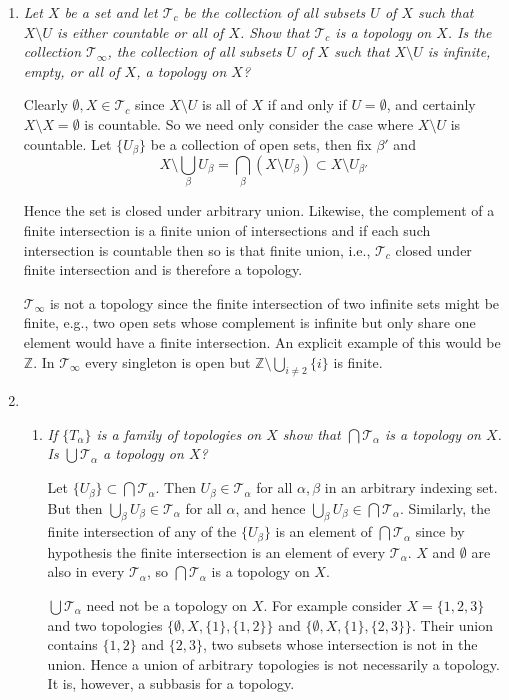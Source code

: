 \documentclass[letterpaper, 11pt]{article}
\newcommand{\Z}{\mathbb{Z}}
\newcommand{\T}{\mathcal{T}}
\begin{document}
\begin{enumerate}
\item \emph{Let $X$ be a set and let $\T_c$ be the collection of all subsets $U$ of $X$ such that $X \setminus U$ is either countable or all of $X$.  Show that $\T_c$ is a topology on $X$.  Is the collection $\T_\infty$, the collection of all subsets $U$ of $X$ such that $X \setminus U$ is infinite, empty, or all of $X$, a topology on $X$?}

Clearly $\emptyset, X \in \T_c$ since $X \setminus U$ is all of $X$ if and only if $U = \emptyset$, and certainly $X \setminus X = \emptyset$ is countable.  So we need only consider the case where $X \setminus U$ is countable.  Let $\{U_\beta\}$ be a collection of open sets, then fix $\beta'$ and
\[
X \setminus \bigcup_\beta U_\beta = \bigcap_\beta (X \setminus U_\beta) \subset X \setminus U_{\beta'}
\]

Hence the set is closed under arbitrary union.  Likewise, the complement of a finite intersection is a finite union of intersections and if each such intersection is countable then so is that finite union, i.e., $\T_c$ closed under finite intersection and is therefore a topology.

$\T_\infty$ is not a topology since the finite intersection of two infinite sets might be finite, e.g., two open sets whose complement is infinite but only share one element would have a finite intersection.  An explicit example of this would be $\Z$.  In $\T_\infty$ every singleton is open but $\Z \setminus \bigcup_{i \neq 2} \{i\}$ is finite.

\item
\begin{enumerate}
\item \emph{If $\{T_\alpha\}$ is a family of topologies on $X$ show that $\bigcap \T_\alpha$ is a topology on $X$.  Is $\bigcup \T_\alpha$ a topology on $X$?}

Let $\{U_\beta\} \subset \bigcap \T_\alpha$.  Then $U_\beta \in \T_\alpha$ for all $\alpha, \beta$ in an arbitrary indexing set.  But then $\bigcup_\beta U_\beta \in \T_\alpha$ for all $\alpha$, and hence $\bigcup_\beta U_\beta \in \bigcap \T_\alpha$.  Similarly, the finite intersection of any of the $\{U_\beta\}$ is an element of $\bigcap \T_\alpha$ since by hypothesis the finite intersection is an element of every $\T_\alpha$.  $X$ and $\emptyset$ are also in every $\T_\alpha$, so $\bigcap \T_\alpha$ is a topology on $X$.

$\bigcup \T_\alpha$ need not be a topology on $X$.  For example consider $X = \{1,2,3\}$ and two topologies $\{\emptyset, X, \{1\}, \{1,2\}\}$ and $\{\emptyset, X, \{1\}, \{2,3\}\}$.  Their union contains $\{1,2\}$ and $\{2,3\}$, two subsets whose intersection is not in the union.  Hence a union of arbitrary topologies is not necessarily a topology.  It is, however, a subbasis for a topology.


\end{enumerate}
\end{enumerate}
\end{document}
